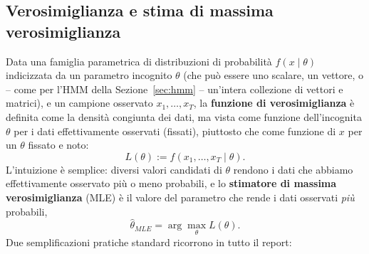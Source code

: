 \documentclass[11pt]{article}
\theoremstyle{definition}
\theoremstyle{remark}
\begin{document}
\subsection{Verosimiglianza e stima di massima verosimiglianza}
\label{sec:mle}

Data una famiglia parametrica di distribuzioni di probabilit\`a $f(x\mid\theta)$ indicizzata da un parametro incognito $\theta$ (che pu\`o essere uno scalare, un vettore, o -- come per l'HMM della Sezione~\ref{sec:hmm} -- un'intera collezione di vettori e matrici), e un campione osservato $x_1,\dots,x_T$, la \textbf{funzione di verosimiglianza} \`e definita come la densit\`a congiunta dei dati, ma vista come funzione dell'incognita $\theta$ per i dati effettivamente osservati (fissati), piuttosto che come funzione di $x$ per un $\theta$ fissato e noto:
\[
L(\theta) := f(x_1,\dots,x_T\mid\theta).
\]
L'intuizione \`e semplice: diversi valori candidati di $\theta$ rendono i dati che abbiamo effettivamente osservato pi\`u o meno probabili, e lo \textbf{stimatore di massima verosimiglianza} (MLE) \`e il valore del parametro che rende i dati osservati \emph{pi\`u} probabili,
\[
\widehat\theta_{MLE} = \arg\max_{\theta} L(\theta).
\]
Due semplificazioni pratiche standard ricorrono in tutto il report:
\end{document}
